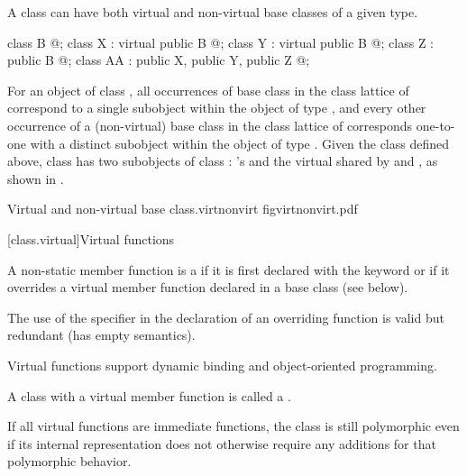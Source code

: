 \pnum
\begin{note}
A class can have both virtual and non-virtual base classes of a given
type.
\begin{codeblock}
class B { @\commentellip@ };
class X : virtual public B { @\commentellip@ };
class Y : virtual public B { @\commentellip@ };
class Z : public B { @\commentellip@ };
class AA : public X, public Y, public Z { @\commentellip@ };
\end{codeblock}
For an object of class , all  occurrences of
base class  in the class lattice of  correspond to a
single  subobject within the object of type , and
every other occurrence of a (non-virtual) base class  in the
class lattice of  corresponds one-to-one with a distinct
 subobject within the object of type . Given the
class  defined above, class  has two subobjects of
class : 's  and the virtual  shared
by  and , as shown in .

%
%
%
\begin{importgraphic}
{Virtual and non-virtual base}
{class.virtnonvirt}
{figvirtnonvirt.pdf}
\end{importgraphic}
\end{note}

[class.virtual]{Virtual functions}%
%
%

\pnum
A non-static member function is a 
if it is first declared with the keyword  or
if it overrides a virtual member function declared in a base class
(see below).
\begin{footnote}
The use of the  specifier in the
declaration of an overriding function is valid but redundant (has empty
semantics).
\end{footnote}
\begin{note}
Virtual functions support dynamic binding and object-oriented
programming.
\end{note}
A class with a virtual member function is called a .
\begin{footnote}
If
all virtual functions are immediate functions,
the class is still polymorphic even if
its internal representation does not otherwise require
any additions for that polymorphic behavior.
\end{footnote}

